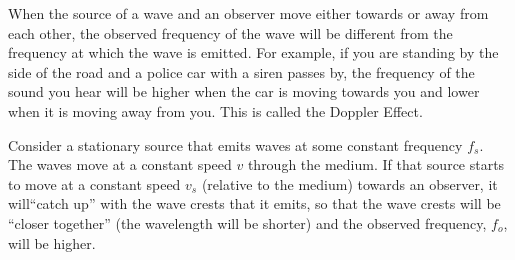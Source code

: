 \question
When the source of a wave and an observer move either towards or away from each other, the observed frequency of the wave will be different from the frequency at which the wave is emitted. For example, if you are standing by the side of the road and a police car with a siren passes by, the frequency of the sound you hear will be higher when the car is moving towards you and lower when it is moving away from you. This is called the Doppler Effect. 

Consider a stationary source that emits waves at some constant frequency $f_s$. The waves move at a constant speed $v$ through the medium. If that source starts to move at a constant speed $v_s$ (relative to the medium) towards an observer, it will``catch up'' with the wave crests that it emits, so that the wave crests will be ``closer together'' (the wavelength will be shorter) and the observed frequency, $f_o$, will be higher. 
